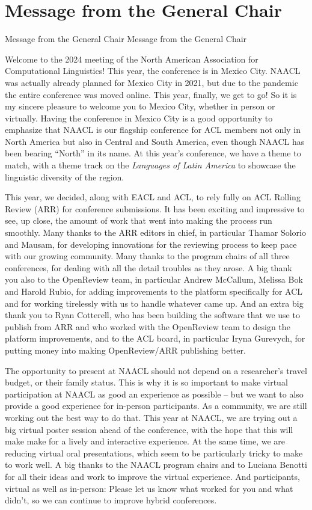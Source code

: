 \section{Message from the General Chair}\vspace{2em}
\setheaders%
    {Message from the General Chair}%
    {Message from the General Chair}
\thispagestyle{emptyheader}
\setlength{\parskip}{1ex}
\setlength{\parindent}{0pt}

Welcome to the 2024 meeting of the North American Association for Computational Linguistics! This year, the conference is in Mexico City. NAACL was actually already planned for Mexico City in 2021, but due to the pandemic the entire conference was moved online. This year, finally, we get to go! So it is my sincere pleasure to welcome you to Mexico City, whether in person or virtually. Having the conference in Mexico City is a good opportunity to emphasize that NAACL is our flagship conference for ACL members not only in North America but also in Central and South America, even though NAACL  has been bearing ``North'' in its name. At this year's conference, we have a theme to match, with a theme track on the \textit{Languages of Latin America} to showcase the linguistic diversity of the region.

This year, we decided, along with EACL and ACL, to rely fully on ACL Rolling Review (ARR) for conference submissions. It has been exciting and impressive to see, up close, the amount of work that went into making the process run smoothly. Many thanks to the ARR editors in chief, in particular Thamar Solorio and Mausam, for developing innovations for the reviewing process to keep pace with our growing community. Many thanks to the program chairs of all three conferences, for dealing with all the detail troubles as they arose. A big thank you also to the OpenReview team, in particular Andrew McCallum, Melissa Bok and Harold Rubio, for adding improvements to the platform specifically for ACL and for working tirelessly with us to handle whatever came up. And an extra big thank you to Ryan Cotterell, who has been building the software that we use to publish from ARR and who worked with the OpenReview team to design the platform improvements, and to the ACL board, in particular Iryna Gurevych, for putting money into making OpenReview/ARR publishing better.

The opportunity to present at NAACL should not depend on a researcher's travel budget, or their family status. This is why it is so important to make virtual participation at NAACL as good an experience as possible -- but we want to also provide a good experience for in-person participants. As a community, we are still working out the best way to do that. This year at NAACL, we are trying out a big virtual poster session ahead of the conference, with the hope that this will make make for a lively and interactive experience. At the same time, we are reducing virtual oral presentations, which seem to be particularly tricky to make to work well. A big thanks to the NAACL program chairs and to Luciana Benotti for all their ideas and work to improve the virtual experience. And participants, virtual as well as in-person: Please let us know what worked for you and what didn't, so we can continue to
improve hybrid conferences. 

